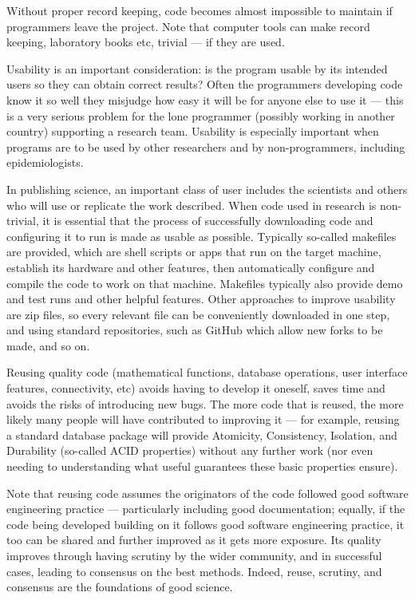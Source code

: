 \documentclass{article}
\begin{document}
Without proper record keeping, code becomes almost impossible to maintain if programmers leave the project. Note that computer tools can make record keeping, laboratory books etc, trivial --- if they are used.

Usability is an important consideration: \cite{hci1,hci2} is the program usable by its intended users so they can obtain correct results? Often the programmers developing code know it so well they misjudge how easy it will be for anyone else to use it --- this is a very serious problem for the lone programmer (possibly working in another country) supporting a research team. Usability is especially important when programs are to be used by other researchers and by non-programmers, including epidemiologists.

{In publishing science, an important class of user includes the scientists and others who will use or replicate the work described. When code used in research is non-trivial, it is essential that the process of successfully downloading code and configuring it to run is made as usable as possible. Typically so-called makefiles are provided, which are shell scripts or apps that run on the target machine, establish its hardware and other features, then automatically configure and compile the code to work on that machine. Makefiles typically also provide demo and test runs and other helpful features. Other approaches to improve usability are zip files, so every relevant file can be conveniently downloaded in one step, and using standard repositories, such as GitHub which allow new forks to be made, and so on.}

Reusing quality code (mathematical functions, database operations, user interface features, connectivity, etc) avoids having to develop it oneself, saves time and avoids the risks of introducing new bugs. The more code that is reused, the more likely many people will have contributed to improving it --- for example, reusing a standard database package will provide Atomicity, Consistency, Isolation, and Durability (so-called ACID properties) without any further work (nor even needing to understanding what useful guarantees these basic properties ensure). 

Note that reusing code assumes the originators of the code followed good software engineering practice --- particularly including good documentation; equally, if the code being developed building on it follows good software engineering practice, it too can be shared and further improved as it gets more exposure. Its quality improves through having scrutiny by the wider community, and in successful cases, leading to consensus on the best methods. Indeed, reuse, scrutiny, and consensus are the foundations of good science.
\end{document}
